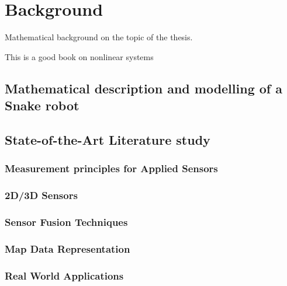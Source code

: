 

\chapter{Background}
Mathematical background on the topic of the thesis.

This is a good book on nonlinear systems \cite{ulin}

\section{Mathematical description and modelling of a Snake robot}


\section{State-of-the-Art Literature study}


\subsection{Measurement principles for Applied Sensors}


\subsection{2D/3D Sensors}


\subsection{Sensor Fusion Techniques}


\subsection{Map Data Representation}


\subsection{Real World Applications}




